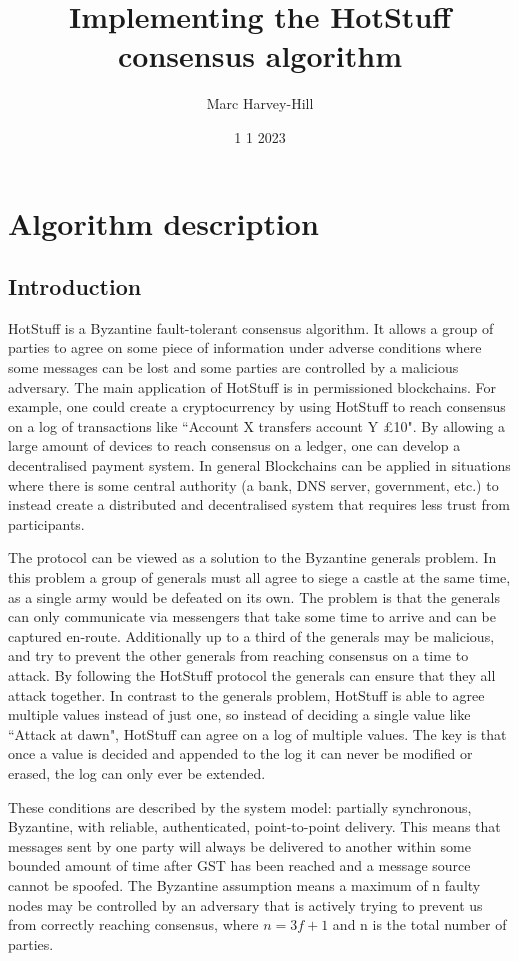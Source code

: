 \documentclass[a4paper]{article}
\begin{document}
\title{
{Implementing the HotStuff consensus algorithm}\\
}
\author{Marc Harvey-Hill}
\date{1 1 2023}
\frenchspacing

\maketitle

\section{Algorithm description}
\subsection{Introduction}
HotStuff is a Byzantine fault-tolerant consensus algorithm. It allows a group of parties to agree on some piece of information under adverse conditions where some messages can be lost and some parties are controlled by a malicious adversary. The main application of HotStuff is in permissioned blockchains. For example, one could create a cryptocurrency by using HotStuff to reach consensus on a log of transactions like ``Account X transfers account Y £10". By allowing a large amount of devices to reach consensus on a ledger, one can develop a decentralised payment system. In general Blockchains can be applied in situations where there is some central authority (a bank, DNS server, government, etc.) to instead create a distributed and decentralised system that requires less trust from participants.

The protocol can be viewed as a solution to the Byzantine generals problem. In this problem a group of generals must all agree to siege a castle at the same time, as a single army would be defeated on its own. The problem is that the generals can only communicate via messengers that take some time to arrive and can be captured en-route. Additionally up to a third of the generals may be malicious, and try to prevent the other generals from reaching consensus on a time to attack. By following the HotStuff protocol the generals can ensure that they all attack together. In contrast to the generals problem, HotStuff is able to agree multiple values instead of just one, so instead of deciding a single value like ``Attack at dawn", HotStuff can agree on a log of multiple values. The key is that once a value is decided and appended to the log it can never be modified or erased, the log can only ever be extended.

These conditions are described by the system model: partially synchronous, Byzantine, with reliable, authenticated, point-to-point delivery. This means that messages sent by one party will always be delivered to another within some bounded amount of time after GST has been reached and a message source cannot be spoofed. The Byzantine assumption means a maximum of n faulty nodes may be controlled by an adversary that is actively trying to prevent us from correctly reaching consensus, where $n = 3f + 1$ and n is the total number of parties.
\end{document}
